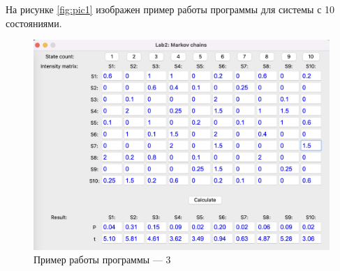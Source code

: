 \documentclass[12pt]{report}
\begin{document}
На рисунке \ref{fig:pic1} изображен пример работы программы для системы с 10 состояниями.

\begin{figure}[h!btp]
	\centering
	\includegraphics[width=1\textwidth]{inc/pic3.png}
	\caption{Пример работы программы --- 3}
	\label{fig:pic3}	
\end{figure}

	
\end{document}
